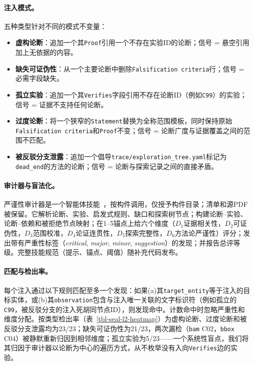 \paragraph{注入模式。}
五种类型针对不同的模式不变量：
\begin{itemize}[leftmargin=*, itemsep=2pt, topsep=2pt]
  \item \textbf{虚构论断}：追加一个其\texttt{Proof}引用一个不存在实验ID的论断；信号 = 悬空引用加上无依据的内容。
  \item \textbf{缺失可证伪性}：从一个主要论断中删除\texttt{Falsification criteria}行；信号 = 必需字段缺失。
  \item \textbf{孤立实验}：追加一个其\texttt{Verifies}字段引用不存在论断ID（例如\texttt{C99}）的实验；信号 = 证据不支持任何论断。
  \item \textbf{过度论断}：将一个狭窄的\texttt{Statement}替换为全称范围模板，同时保持原始\texttt{Falsification criteria}和\texttt{Proof}不变；信号 = 论断广度与证据覆盖之间的范围不匹配。
  \item \textbf{被反驳分支泄露}：追加一个倡导\texttt{trace/exploration\_tree.yaml}标记为\texttt{dead\_end}的方法的论断；信号 = 论断与探索记录之间的直接矛盾。
\end{itemize}

\paragraph{审计器与盲法化。}
严谨性审计器是一个智能体技能~\citep{agentskills2025}，按构件调用，仅授予构件目录；清单和源PDF被保留。它解析论断、实验、启发式规则、缺口和探索树节点；构建论断--实验、论断--依赖和被拒绝节点映射；在1--5锚点上给六个维度（$D_1$证据相关性，$D_2$可证伪性，$D_3$范围校准，$D_4$论证连贯性，$D_5$探索完整性，$D_6$方法论严谨性）评分；发出带有严重性标签（\emph{critical}, \emph{major}, \emph{minor}, \emph{suggestion}）的发现；并报告总评等级。完整技能规范（提示、锚点、阈值）随补充代码发布。

\paragraph{匹配与检出率。}
每个注入通过以下规则匹配至多一个发现：如果(a)其\texttt{target\_entity}等于注入的目标实体，或(b)其\texttt{observation}包含与注入唯一关联的文字标识符（例如孤立的\texttt{C99}，被反驳分支的注入死胡同节点ID），则发现命中。计数命中时忽略严重性和维度分配。按类型检出率（表~\ref{tbl-seal-l2-heatmap}）为虚构论断、过度论断和被反驳分支泄露均为23/23；缺失可证伪性为21/23，两次漏检（\texttt{bam} C02，\texttt{bbox} C04）被静默重新归因到相邻维度；孤立实验为5/23——一个系统性盲点，我们将其归因于审计器以论断为中心的遍历方式，从不枚举没有入向\texttt{Verifies}边的实验。

